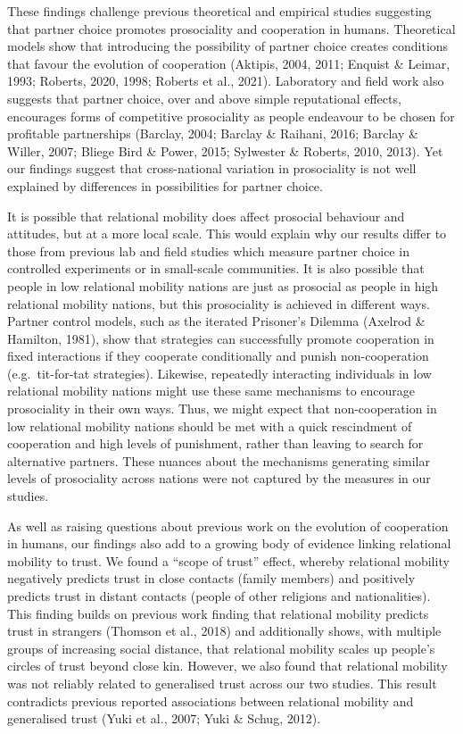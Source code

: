 \documentclass[english,man,floatsintext]{apa6}
\begin{document}
These findings challenge previous theoretical and empirical studies suggesting that partner choice promotes prosociality and cooperation in humans. Theoretical models show that introducing the possibility of partner choice creates conditions that favour the evolution of cooperation (Aktipis, 2004, 2011; Enquist \& Leimar, 1993; Roberts, 2020, 1998; Roberts et al., 2021). Laboratory and field work also suggests that partner choice, over and above simple reputational effects, encourages forms of competitive prosociality as people endeavour to be chosen for profitable partnerships (Barclay, 2004; Barclay \& Raihani, 2016; Barclay \& Willer, 2007; Bliege Bird \& Power, 2015; Sylwester \& Roberts, 2010, 2013). Yet our findings suggest that cross-national variation in prosociality is not well explained by differences in possibilities for partner choice.

It is possible that relational mobility does affect prosocial behaviour and attitudes, but at a more local scale. This would explain why our results differ to those from previous lab and field studies which measure partner choice in controlled experiments or in small-scale communities. It is also possible that people in low relational mobility nations are just as prosocial as people in high relational mobility nations, but this prosociality is achieved in different ways. Partner control models, such as the iterated Prisoner's Dilemma (Axelrod \& Hamilton, 1981), show that strategies can successfully promote cooperation in fixed interactions if they cooperate conditionally and punish non-cooperation (e.g.~tit-for-tat strategies). Likewise, repeatedly interacting individuals in low relational mobility nations might use these same mechanisms to encourage prosociality in their own ways. Thus, we might expect that non-cooperation in low relational mobility nations should be met with a quick rescindment of cooperation and high levels of punishment, rather than leaving to search for alternative partners. These nuances about the mechanisms generating similar levels of prosociality across nations were not captured by the measures in our studies.

As well as raising questions about previous work on the evolution of cooperation in humans, our findings also add to a growing body of evidence linking relational mobility to trust. We found a \enquote{scope of trust} effect, whereby relational mobility negatively predicts trust in close contacts (family members) and positively predicts trust in distant contacts (people of other religions and nationalities). This finding builds on previous work finding that relational mobility predicts trust in strangers (Thomson et al., 2018) and additionally shows, with multiple groups of increasing social distance, that relational mobility scales up people's circles of trust beyond close kin. However, we also found that relational mobility was not reliably related to generalised trust across our two studies. This result contradicts previous reported associations between relational mobility and generalised trust (Yuki et al., 2007; Yuki \& Schug, 2012).
\end{document}

